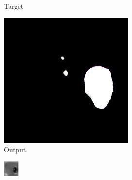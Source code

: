 \begin{figure}
\begin{subfigure}{.19\textwidth}
		\caption{Target}
	\end{subfigure}
	\begin{subfigure}{.19\textwidth}
		\centering
		\includegraphics[width=.9\linewidth]{img/results/b03_output}
		\caption{Output}
	\end{subfigure}
	\begin{subfigure}{.19\textwidth}
		\centering
		\includegraphics[width=.9\linewidth,interpolate=false]{img/results/b03_real}

\end{subfigure}
\end{figure}
